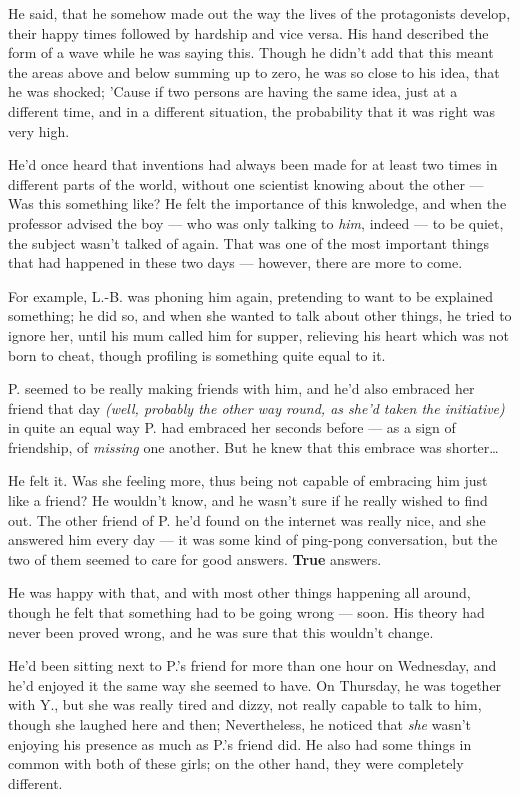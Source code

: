 He said, that he somehow made out the way the lives of the protagonists develop, their happy times followed by hardship and vice versa. 
His hand described the form of a wave while he was saying this. 
Though he didn't add that this meant the areas above and below summing up to zero, he was so close to his idea, that he was shocked; 'Cause if two persons are having the same idea, just at a different time, and in a different situation, the probability that it was right was very high.

He'd once heard that inventions had always been made for at least two times in different parts of the world, without one scientist knowing about the other --- Was this something like?
He felt the importance of this knwoledge, and when the professor advised the boy --- who was only talking to \emph{him}, indeed --- to be quiet, the subject wasn't talked of again. 
That was one of the most important things that had happened in these two days --- however, there are more to come.

For example, L.-B. was phoning him again, pretending to want to be explained something; he did so, and when she wanted to talk about other things, he tried to ignore her, until his mum called him for supper, relieving his heart which was not born to cheat, though profiling is something quite equal to it.

P. seemed to be really making friends with him, and he'd also embraced her friend that day \emph{(well, probably the other way round, as she'd taken the initiative)} in quite an equal way P. had embraced her seconds before --- as a sign of friendship, of \emph{missing} one another. But he knew that this embrace was shorter\dots{}

He felt it. Was she feeling more, thus being not capable of embracing him just like a friend?
He wouldn't know, and he wasn't sure if he really wished to find out. 
The other friend of P. he'd found on the internet was really nice, and she answered him every day --- it was some kind of ping-pong conversation, but the two of them seemed to care for good answers. 
\textbf{True} answers.

He was happy with that, and with most other things happening all around, though he felt that something had to be going wrong --- soon. His theory had never been proved wrong, and he was sure that this wouldn't change.

He'd been sitting next to P.'s friend for more than one hour on Wednesday, and he'd enjoyed it the same way she seemed to have. On Thursday, he was together with Y., but she was really tired and dizzy, not really capable to talk to him, though she laughed here and then; Nevertheless, he noticed that \emph{she} wasn't enjoying his presence as much as P.'s friend did. 
He also had some things in common with both of these girls; on the other hand, they were completely different.

